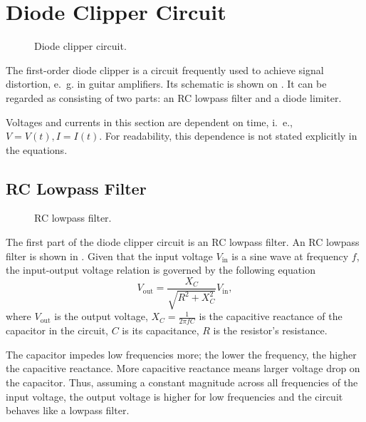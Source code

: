 \section{Diode Clipper Circuit}
\label{subsec:diode_clipper_intro}
\begin{figure}
  \centering
  
  \caption{Diode clipper circuit.}
  \label{fig:diode_clipper_circuit}
\end{figure}

The first-order diode clipper is a circuit frequently used to achieve signal distortion, e.\ g. in guitar amplifiers. Its schematic is shown on . It can be regarded as consisting of two parts: an RC lowpass filter and a diode limiter.

Voltages and currents in this section are dependent on time, i.\ e., $V = V(t), I= I(t)$. For readability, this dependence is not stated explicitly in the equations.

\subsection{RC Lowpass Filter}

\begin{figure}
  \centering
  
  \caption{RC lowpass filter.}
  \label{fig:rc_lowpass}
\end{figure}

The first part of the diode clipper circuit is an RC lowpass filter. An RC lowpass filter is shown in . Given that the input voltage $V_\text{in}$ is a sine wave at frequency $f$, the input-output voltage relation is governed by the following equation
\begin{equation}
  V_\text{out} = \frac{X_C}{\sqrt{R^2 + X_C^2}} V_\text{in},
  \label{eq:rc_circuit}
\end{equation}
where $V_\text{out}$ is the output voltage, $X_C=\frac{1}{2\pi f C}$ is the capacitive reactance of the capacitor in the circuit, $C$ is its capacitance, $R$ is the resistor's resistance.

The capacitor impedes low frequencies more; the lower the frequency, the higher the capacitive reactance. More capacitive reactance means larger voltage drop on the capacitor. Thus, assuming a constant magnitude across all frequencies of the input voltage, the output voltage is higher for low frequencies and the circuit behaves like a lowpass filter.

